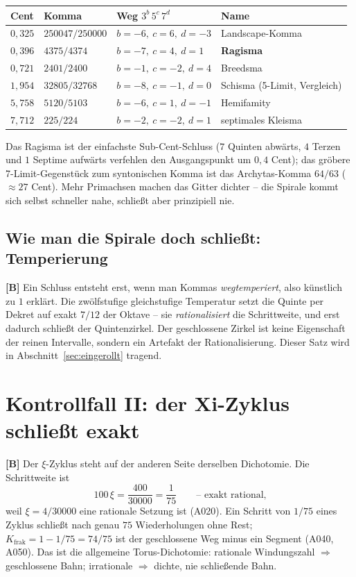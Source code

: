 \begin{center}
\begin{tabular}{llll}
\toprule
Cent & Komma & Weg $3^{b}\,5^{c}\,7^{d}$ & Name \\
\midrule
$0{,}325$ & $250047/250000$ & $b=-6,\ c=6,\ d=-3$ & Landscape-Komma \\
$0{,}396$ & $4375/4374$ & $b=-7,\ c=4,\ d=1$ & \textbf{Ragisma} \\
$0{,}721$ & $2401/2400$ & $b=-1,\ c=-2,\ d=4$ & Breedsma \\
$1{,}954$ & $32805/32768$ & $b=-8,\ c=-1,\ d=0$ & Schisma (5-Limit, Vergleich) \\
$5{,}758$ & $5120/5103$ & $b=-6,\ c=1,\ d=-1$ & Hemifamity \\
$7{,}712$ & $225/224$ & $b=-2,\ c=-2,\ d=1$ & septimales Kleisma \\
\bottomrule
\end{tabular}
\end{center}

Das Ragisma ist der einfachste Sub-Cent-Schluss ($7$ Quinten abw\"arts,
$4$ Terzen und $1$ Septime aufw\"arts verfehlen den Ausgangspunkt um
$0{,}4$ Cent); das gr\"obere 7-Limit-Gegenst\"uck zum syntonischen Komma ist
das Archytas-Komma $64/63$ ($\approx 27$ Cent). Mehr Primachsen machen das
Gitter dichter -- die Spirale kommt sich selbst schneller nahe, schlie\ss t
aber prinzipiell nie.

\subsection{Wie man die Spirale doch schlie\ss t: Temperierung}

\textbf{[B]} Ein Schluss entsteht erst, wenn man Kommas \emph{wegtemperiert},
also k\"unstlich zu $1$ erkl\"art. Die zw\"olfstufige gleichstufige Temperatur
setzt die Quinte per Dekret auf exakt $7/12$ der Oktave -- sie
\emph{rationalisiert} die Schrittweite, und erst dadurch schlie\ss t der
Quintenzirkel. Der geschlossene Zirkel ist keine Eigenschaft der reinen
Intervalle, sondern ein Artefakt der Rationalisierung. Dieser Satz wird in
Abschnitt~\ref{sec:eingerollt} tragend.

\section{Kontrollfall II: der Xi-Zyklus schlie\ss t exakt}

\textbf{[B]} Der $\xi$-Zyklus steht auf der anderen Seite derselben
Dichotomie. Die Schrittweite ist
\[
  100\,\xi = \frac{400}{30000} = \frac{1}{75}
  \qquad\text{-- exakt rational,}
\]
weil $\xi = 4/30000$ eine rationale Setzung ist (A020). Ein Schritt von
$1/75$ eines Zyklus schlie\ss t nach genau $75$ Wiederholungen ohne Rest;
$K_\text{frak} = 1 - 1/75 = 74/75$ ist der geschlossene Weg minus ein
Segment (A040, A050). Das ist die allgemeine Torus-Dichotomie: rationale
Windungszahl $\Rightarrow$ geschlossene Bahn; irrationale $\Rightarrow$
dichte, nie schlie\ss ende Bahn.

